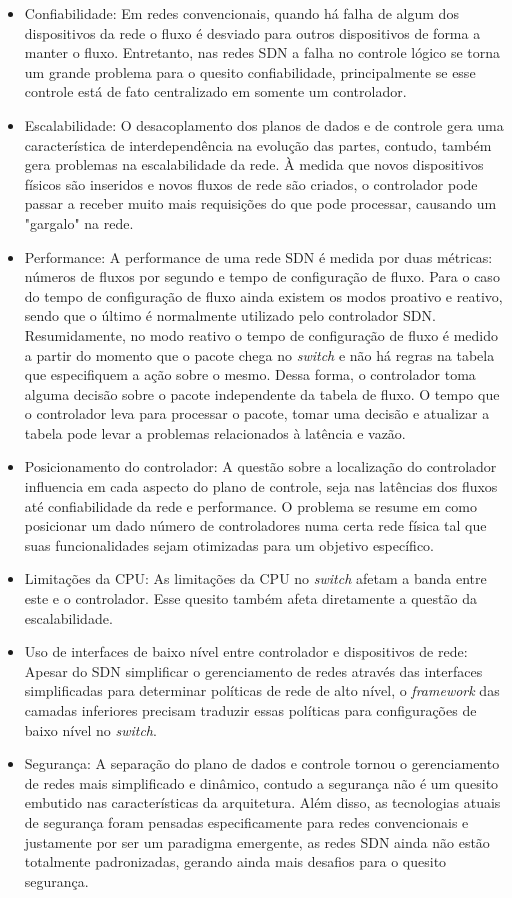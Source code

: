 \begin{itemize}
    \item Confiabilidade: Em redes convencionais, quando há falha de algum dos dispositivos da rede o fluxo é desviado para outros dispositivos de forma a manter o fluxo. Entretanto, nas redes SDN a falha no controle lógico se torna um grande problema para o quesito confiabilidade, principalmente se esse controle está de fato centralizado em somente um controlador. 
    \item Escalabilidade: O desacoplamento dos planos de dados e de controle gera uma característica de interdependência na evolução das partes, contudo, também gera problemas na escalabilidade da rede. À medida que novos dispositivos físicos são inseridos e novos fluxos de rede são criados, o controlador pode passar a receber muito mais requisições do que pode processar, causando um "gargalo" na rede.
    \item Performance: A performance de uma rede SDN é medida por duas métricas: números de fluxos por segundo e tempo de configuração de fluxo. Para o caso do tempo de configuração de fluxo ainda existem os modos proativo e reativo, sendo que o último é normalmente utilizado pelo controlador SDN. Resumidamente, no modo reativo o tempo de configuração de fluxo é medido a partir do momento que o pacote chega no \emph{switch} e não há regras na tabela que especifiquem a ação sobre o mesmo. Dessa forma, o controlador toma alguma decisão sobre o pacote independente da tabela de fluxo. O tempo que o controlador leva para processar o pacote, tomar uma decisão e atualizar a tabela pode levar a problemas relacionados à latência e vazão.
    \item Posicionamento do controlador: A questão sobre a localização do controlador influencia em cada aspecto do plano de controle, seja nas latências dos fluxos até confiabilidade da rede e performance. O problema se resume em como posicionar um dado número de controladores numa certa rede física tal que suas funcionalidades sejam otimizadas para um objetivo específico.
    \item Limitações da CPU: As limitações da CPU no \emph{switch} afetam a banda entre este e o controlador. Esse quesito também afeta diretamente a questão da escalabilidade.
    \item Uso de interfaces de baixo nível entre controlador e dispositivos de rede: Apesar do SDN simplificar o gerenciamento de redes através das interfaces simplificadas para determinar políticas de rede de alto nível, o \emph{framework} das camadas inferiores precisam traduzir essas políticas para configurações de baixo nível no \emph{switch}.
    \item Segurança: A separação do plano de dados e controle tornou o gerenciamento de redes mais simplificado e dinâmico, contudo a segurança não é um quesito embutido nas características da arquitetura. Além disso, as tecnologias atuais de segurança foram pensadas especificamente para redes convencionais e justamente por ser um paradigma emergente, as redes SDN ainda não estão totalmente padronizadas, gerando ainda mais desafios para o quesito segurança.
    
\end{itemize}



